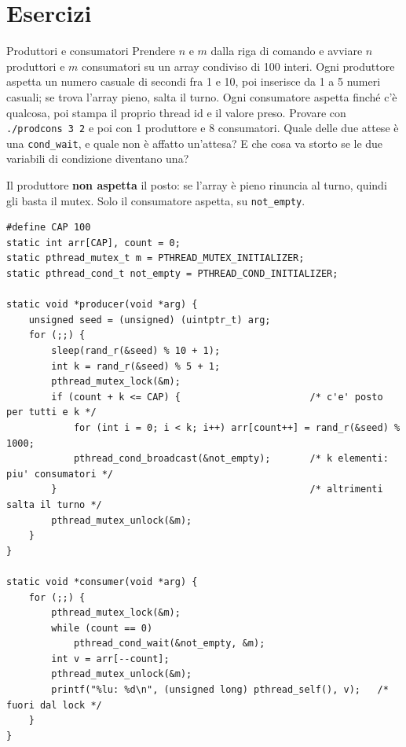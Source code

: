 \section{Esercizi}

\begin{esercizio}{Produttori e consumatori}
Prendere $n$ e $m$ dalla riga di comando e avviare $n$ produttori e $m$ consumatori su un array condiviso di 100 interi.
Ogni produttore aspetta un numero casuale di secondi fra 1 e 10, poi inserisce da 1 a 5 numeri casuali; se trova l'array
pieno, salta il turno. Ogni consumatore aspetta finché c'è qualcosa, poi stampa il proprio thread id e il valore preso.
Provare con \texttt{./prodcons 3 2} e poi con 1 produttore e 8 consumatori. Quale delle due attese è una
\texttt{cond\_wait}, e quale non è affatto un'attesa? E che cosa va storto se le due variabili di condizione diventano
una?

\svolgimento
Il produttore \textbf{non aspetta} il posto: se l'array è pieno rinuncia al turno, quindi gli basta il mutex. Solo il
consumatore aspetta, su \texttt{not\_empty}.

\begin{lstlisting}[language={[POSIX]C}, style=wnumbers, title={prodcons.c: le due funzioni dei thread}]
#define CAP 100
static int arr[CAP], count = 0;
static pthread_mutex_t m = PTHREAD_MUTEX_INITIALIZER;
static pthread_cond_t not_empty = PTHREAD_COND_INITIALIZER;

static void *producer(void *arg) {
    unsigned seed = (unsigned) (uintptr_t) arg;
    for (;;) {
        sleep(rand_r(&seed) % 10 + 1);
        int k = rand_r(&seed) % 5 + 1;
        pthread_mutex_lock(&m);
        if (count + k <= CAP) {                       /* c'e' posto per tutti e k */
            for (int i = 0; i < k; i++) arr[count++] = rand_r(&seed) % 1000;
            pthread_cond_broadcast(&not_empty);       /* k elementi: piu' consumatori */
        }                                             /* altrimenti salta il turno */
        pthread_mutex_unlock(&m);
    }
}

static void *consumer(void *arg) {
    for (;;) {
        pthread_mutex_lock(&m);
        while (count == 0)
            pthread_cond_wait(&not_empty, &m);
        int v = arr[--count];
        pthread_mutex_unlock(&m);
        printf("%lu: %d\n", (unsigned long) pthread_self(), v);   /* fuori dal lock */
    }
}
\end{lstlisting}


\end{esercizio}
